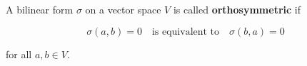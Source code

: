A bilinear form $\sigma$ on a vector space $V$ is called \textbf{orthosymmetric} if

$$\sigma(a, b) = 0 \quad \text{is equivalent to} \quad \sigma(b, a) = 0$$

for all $a, b \in V$.
